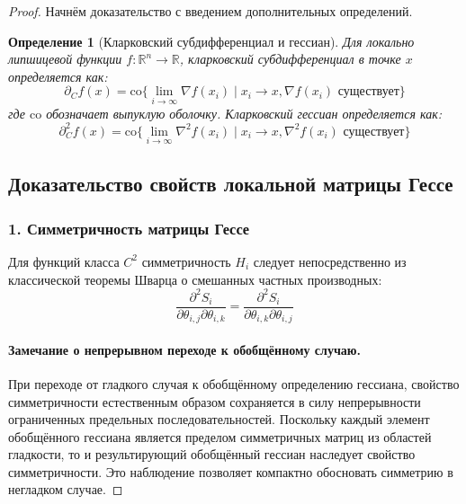 \documentclass[a4paper,12pt]{article}
\newtheorem{definition}{Определение}
\begin{document}
    \begin{proof} Начнём доказательство с введением дополнительных определений.
    
    \begin{definition}[Кларковский субдифференциал и гессиан]
    Для локально липшицевой функции $f: \mathbb{R}^n \rightarrow \mathbb{R}$, кларковский субдифференциал в точке $x$ определяется как:
    \begin{equation}
    \partial_C f(x) = \text{co}\{\lim_{i\to\infty} \nabla f(x_i) \mid x_i \to x, \nabla f(x_i) \text{ существует}\}
    \end{equation}
    где $\text{co}$ обозначает выпуклую оболочку. Кларковский гессиан определяется как:
    \begin{equation}
    \partial_C^2 f(x) = \text{co}\{\lim_{i\to\infty} \nabla^2 f(x_i) \mid x_i \to x, \nabla^2 f(x_i) \text{ существует}\}
    \end{equation}
    \end{definition}
    
    \subsection*{Доказательство свойств локальной матрицы Гессе}
    
    \subsubsection*{1. Симметричность матрицы Гессе}
    
    Для функций класса $C^2$ симметричность $H_i$ следует непосредственно из классической теоремы Шварца о смешанных частных производных:
    \begin{equation}
    \frac{\partial^2 S_i}{\partial \theta_{i,j} \partial \theta_{i,k}} = \frac{\partial^2 S_i}{\partial \theta_{i,k} \partial \theta_{i,j}}
    \end{equation}
    
    \paragraph{Замечание о непрерывном переходе к обобщённому случаю.}
    При переходе от гладкого случая к обобщённому определению гессиана, свойство симметричности естественным образом сохраняется в силу непрерывности ограниченных предельных последовательностей. Поскольку каждый элемент обобщённого гессиана является пределом симметричных матриц из областей гладкости, то и результирующий обобщённый гессиан наследует свойство симметричности. Это наблюдение позволяет компактно обосновать симметрию в негладком случае.
    

\end{proof}
\end{document}
